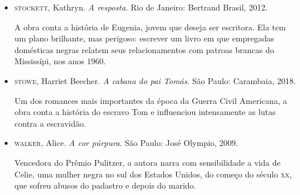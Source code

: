 \documentclass[12pt]{extarticle}
\begin{document}
\begin{itemize}
\item
\textsc{stockett}, Kathryn. \textit{A resposta}. Rio de Janeiro: Bertrand
Brasil, 2012.

A obra conta a história de Eugenia, jovem que deseja ser escritora. Ela
tem um plano brilhante, mas perigoso: escrever um livro em que
empregadas domésticas negras relatem seus relacionamentos com patroas
brancas do Mississípi, nos anos 1960.

\item
\textsc{stowe}, Harriet Beecher. \textit{A cabana do pai Tomás}. São Paulo:
Carambaia, 2018.

Um dos romances mais importantes da época da Guerra Civil Americana, a
obra conta a história do escravo Tom e influenciou intensamente as lutas
contra a escravidão.

\item
\textsc{walker}, Alice. \textit{A cor púrpura}. São Paulo: José Olympio, 2009.

Vencedora do Prêmio Pulitzer, a autora narra com sensibilidade a vida de
Celie, uma mulher negra no sul dos Estados Unidos, do começo do século
\textsc{xx}, que sofreu abusos do padastro e depois do marido.

\end{itemize}
\end{document}
